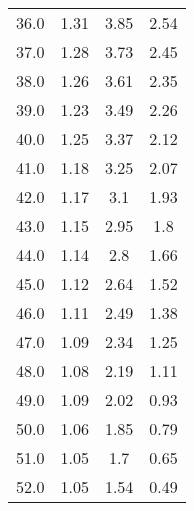 \begin{table}
\begin{tabular}{cccc}
36.0 & 1.31 & 3.85 & 2.54 \\
37.0 & 1.28 & 3.73 & 2.45 \\
38.0 & 1.26 & 3.61 & 2.35 \\
39.0 & 1.23 & 3.49 & 2.26 \\
40.0 & 1.25 & 3.37 & 2.12 \\
41.0 & 1.18 & 3.25 & 2.07 \\
42.0 & 1.17 & 3.1 & 1.93 \\
43.0 & 1.15 & 2.95 & 1.8 \\
44.0 & 1.14 & 2.8 & 1.66 \\
45.0 & 1.12 & 2.64 & 1.52 \\
46.0 & 1.11 & 2.49 & 1.38 \\
47.0 & 1.09 & 2.34 & 1.25 \\
48.0 & 1.08 & 2.19 & 1.11 \\
49.0 & 1.09 & 2.02 & 0.93 \\
50.0 & 1.06 & 1.85 & 0.79 \\
51.0 & 1.05 & 1.7 & 0.65 \\
52.0 & 1.05 & 1.54 & 0.49 \\
\end{tabular}
\end{table}
